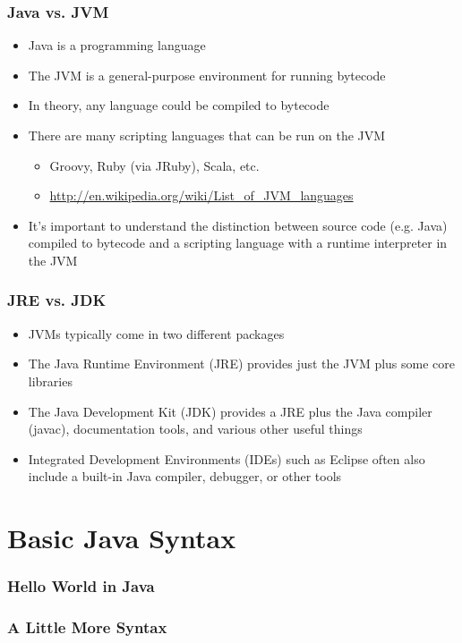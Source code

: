 \documentclass{beamer}
\begin{document}
\begin{frame}
\frametitle{Java vs. JVM}
\begin{itemize}
\item Java is a programming language
\item The JVM is a general-purpose environment for running bytecode
\item In theory, any language could be compiled to bytecode
\item There are many scripting languages that can be run on the JVM
\begin{itemize}
\item Groovy, Ruby (via JRuby), Scala, etc.
\item \url{http://en.wikipedia.org/wiki/List_of_JVM_languages}
\end{itemize}
\item It's important to understand the distinction between source code (e.g. Java) compiled to bytecode and a scripting language with a runtime interpreter in the JVM
\end{itemize}
\end{frame}

\begin{frame}
\frametitle{JRE vs. JDK}
\begin{itemize}
\item JVMs typically come in two different packages
\item The Java Runtime Environment (JRE) provides just the JVM plus some core libraries
\item The Java Development Kit (JDK) provides a JRE plus the Java compiler (javac), documentation tools, and various other useful things
\item Integrated Development Environments (IDEs) such as Eclipse often also include a built-in Java compiler, debugger, or other tools
\end{itemize}
\end{frame}

\section{Basic Java Syntax}
\begin{frame}[fragile]
\frametitle{Hello World in Java}

\end{frame}

\begin{frame}[fragile]
\frametitle{A Little More Syntax}

\end{frame}
\end{document}
